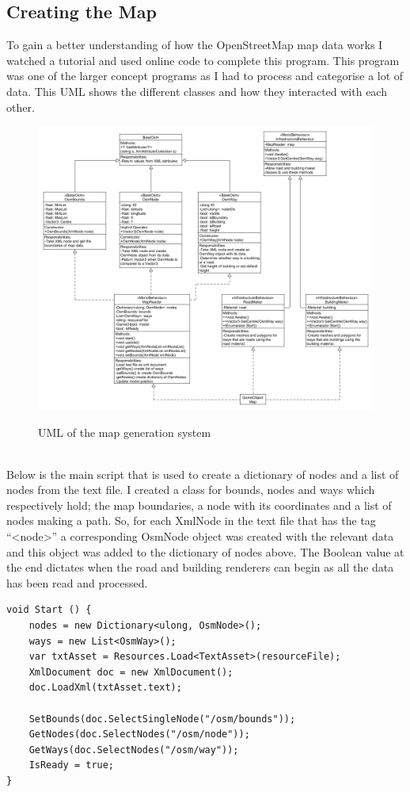 \documentclass[a4paper]{report}
\begin{document}
\subsection{Creating the Map}
To gain a better understanding of how the OpenStreetMap map data works I watched a tutorial and used online code to complete this program. This program was one of the larger concept programs as I had to process and categorise a lot of data. This UML shows the different classes and how they interacted with each other. \cite{Sloan}
\begin{figure}[h]
	\includegraphics[scale=0.35]{"Map UML"}
	\label{Figure 2: UML of processing map}
	\caption{UML of the map generation system}
\end{figure}
\\Below is the main script that is used to create a dictionary of nodes and a list of nodes from the text file. I created a class for bounds, nodes and ways which respectively hold; the map boundaries, a node with its coordinates and a list of nodes making a path. So, for each XmlNode in the text file that has the tag “<node>” a corresponding OsmNode object was created with the relevant data and this object was added to the dictionary of nodes above. The Boolean value at the end dictates when the road and building renderers can begin as all the data has been read and processed. 
\pagebreak
\begin{Verbatim}[tabsize=4]
void Start () {
	nodes = new Dictionary<ulong, OsmNode>();
	ways = new List<OsmWay>();
	var txtAsset = Resources.Load<TextAsset>(resourceFile);
	XmlDocument doc = new XmlDocument();
	doc.LoadXml(txtAsset.text);
	
	SetBounds(doc.SelectSingleNode("/osm/bounds"));
	GetNodes(doc.SelectNodes("/osm/node"));
	GetWays(doc.SelectNodes("/osm/way"));
	IsReady = true;
}
\end{Verbatim}
\end{document}
